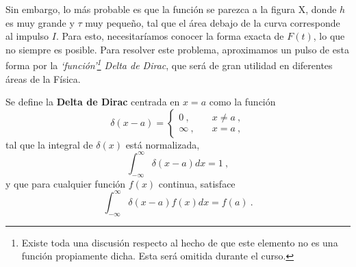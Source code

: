 Sin embargo, lo más probable es que la función se parezca a la figura X, donde $h$ es muy grande y $\tau$ muy pequeño, tal que el área debajo de la curva corresponde al impulso $I$. Para esto, necesitaríamos conocer la forma exacta de $F(t)$, lo que no siempre es posible. Para resolver este problema, aproximamos un pulso de esta forma por la \emph{`función'\footnote{Existe toda una discusión respecto al hecho de que este elemento no es una función propiamente dicha. Esta será omitida durante el curso.} Delta de Dirac}, que será de gran utilidad en diferentes áreas de la Física.

\begin{defi}
    Se define la \textbf{Delta de Dirac} centrada en $x=a$ como la función
    \begin{equation}
        \delta(x-a) = \left\{ \begin{array}{cc}
            0 \ , & \quad x \neq a \ , \\
            \infty \ , & \quad x = a \ ,
        \end{array} \right.
    \end{equation}
    tal que la integral de $\delta(x)$ está normalizada,
    \begin{equation}
        \int_{-\infty}^{\infty} \delta(x-a) dx = 1 \ ,
    \end{equation}
    y que para cualquier función $f(x)$ continua, satisface
    \begin{equation}
        \int_{-\infty}^{\infty} \delta(x-a) f(x) dx = f(a) \ .
    \end{equation}
\end{defi}

